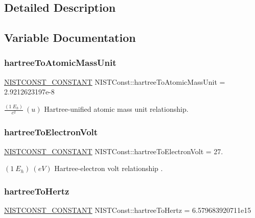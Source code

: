 \subsection{Detailed Description}


\subsection{Variable Documentation}
\mbox{\label{group___n_i_s_t_const-_hartree_gadd551bb415cf6590fe86cbab53282790}} 
\subsubsection{\texorpdfstring{hartree\+To\+Atomic\+Mass\+Unit}{hartreeToAtomicMassUnit}}
{\footnotesize\ttfamily \mbox{\hyperlink{group___n_i_s_t_const-_macros_ga2b0fc1d7452373f816175dd86ce26729}{N\+I\+S\+T\+C\+O\+N\+S\+T\+\_\+\+C\+O\+N\+S\+T\+A\+NT}} N\+I\+S\+T\+Const\+::hartree\+To\+Atomic\+Mass\+Unit = 2.\+9212623197e-\/8}

$\frac{(1\ E_h)}{c^2} \ (u)$ Hartree-\/unified atomic mass unit relationship. \mbox{\label{group___n_i_s_t_const-_hartree_gaba497bbf24c554950d652cdfa84b102c}} 
\subsubsection{\texorpdfstring{hartree\+To\+Electron\+Volt}{hartreeToElectronVolt}}
{\footnotesize\ttfamily \mbox{\hyperlink{group___n_i_s_t_const-_macros_ga2b0fc1d7452373f816175dd86ce26729}{N\+I\+S\+T\+C\+O\+N\+S\+T\+\_\+\+C\+O\+N\+S\+T\+A\+NT}} N\+I\+S\+T\+Const\+::hartree\+To\+Electron\+Volt = 27.}

$(1\ E_h) \ (eV)$ Hartree-\/electron volt relationship . \mbox{\label{group___n_i_s_t_const-_hartree_gabf95934e6d5fe9b153d31d35a67a190c}} 
\subsubsection{\texorpdfstring{hartree\+To\+Hertz}{hartreeToHertz}}
{\footnotesize\ttfamily \mbox{\hyperlink{group___n_i_s_t_const-_macros_ga2b0fc1d7452373f816175dd86ce26729}{N\+I\+S\+T\+C\+O\+N\+S\+T\+\_\+\+C\+O\+N\+S\+T\+A\+NT}} N\+I\+S\+T\+Const\+::hartree\+To\+Hertz = 6.\+579683920711e15}

